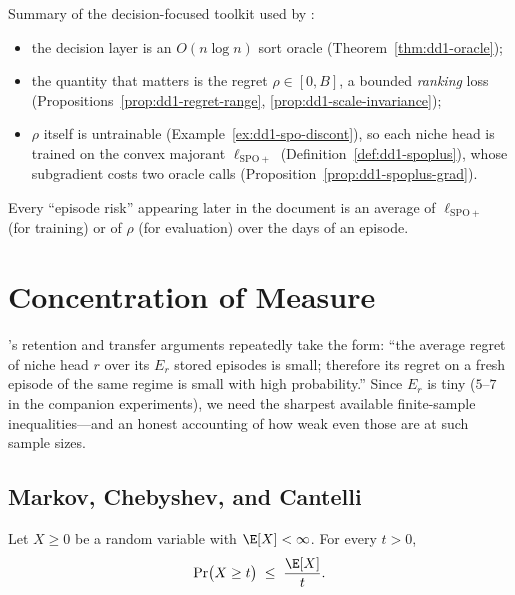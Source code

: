 \begin{keypoint}
Summary of the decision-focused toolkit used by \nm{}:
\begin{itemize}
\item the decision layer is an $O(n \log n)$ sort oracle
      (Theorem~\ref{thm:dd1-oracle});
\item the quantity that matters is the regret
      $\rho \in [0, B]$, a bounded \emph{ranking} loss
      (Propositions~\ref{prop:dd1-regret-range},
      \ref{prop:dd1-scale-invariance});
\item $\rho$ itself is untrainable
      (Example~\ref{ex:dd1-spo-discont}), so each niche head is trained on
      the convex majorant $\ell_{\mathrm{SPO+}}$
      (Definition~\ref{def:dd1-spoplus}), whose subgradient costs two oracle
      calls (Proposition~\ref{prop:dd1-spoplus-grad}).
\end{itemize}
Every ``episode risk'' appearing later in the document is an average of
$\ell_{\mathrm{SPO+}}$ (for training) or of $\rho$ (for evaluation) over the
days of an episode.
\end{keypoint}

\section{Concentration of Measure}
\label{sec:dd1-concentration}

\nm{}'s retention and transfer arguments repeatedly take the form: ``the
average regret of niche head $r$ over its $E_r$ stored episodes is small;
therefore its regret on a fresh episode of the same regime is small with high
probability.'' Since $E_r$ is tiny ($5$--$7$ in the companion experiments),
we need the sharpest available finite-sample inequalities---and an honest
accounting of how weak even those are at such sample sizes.

\subsection{Markov, Chebyshev, and Cantelli}

\begin{theorem}
\label{thm:dd1-markov}
Let $X \ge 0$ be a random variable with $\E[X] < \infty$. For every $t > 0$,
\begin{equation}
\label{eq:dd1-markov}
\Pr\bigl( X \ge t \bigr) \;\le\; \frac{\E[X]}{t}.
\end{equation}
\end{theorem}

